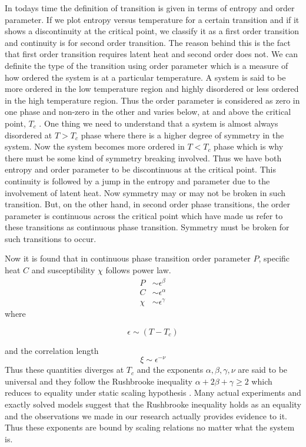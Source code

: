 	
	In todays time the definition of transition is given in terms of entropy and order parameter. If we plot entropy versus temperature for a certain transition and if it shows a discontinuity at the critical point, we classify it as a first order transition and continuity is for second order transition. The reason behind this is the fact that first order transition requires latent heat \cite{Perrot1998} and second order does not. We can definite the type of the transition using order parameter which is a measure of how ordered the system is at a particular temperature. A system is said to be more ordered in the low temperature region and highly disordered or less ordered in the high temperature region. Thus the order parameter is considered as zero in one phase and non-zero in the other and varies below, at and above the critical point, $T_c$ \cite{Rahman2017}. One thing we need to understand that a system is almost always disordered at $T > T_c$ phase where there is a higher degree of symmetry in the system. Now the system becomes more ordered in $T < T_c$ phase which is why there must be some kind of symmetry breaking involved. 
	Thus we have both entropy and order parameter to be discontinuous at the critical point. This continuity is followed by a jump in the entropy and parameter due to the involvement of latent heat. Now symmetry may or may not be broken in such transition. But, on the other hand, in second order phase transitions, the order parameter is continuous across the critical point which have made us refer to these transitions as continuous phase transition. Symmetry must be broken for such transitions to occur.
	
	Now it is found that in continuous phase transition order parameter $P$, specific heat $C$ and susceptibility $\chi$ follows power law.
	\begin{eqnarray}
		P &\sim \epsilon^\beta \\
		C &\sim \epsilon^\alpha \\
		\chi &\sim \epsilon^\gamma
	\end{eqnarray}
	where
	
	\begin{equation}
		\epsilon \sim (T-T_c)
	\end{equation} 
	
	 and the correlation length
	 \begin{equation}
		 \xi \sim \epsilon^{-\nu}
	 \end{equation}
	 Thus these quantities diverges at $T_c$ and the exponents $\alpha, \beta, \gamma, \nu$ are said to be universal and they follow the Rushbrooke inequality $\alpha + 2 \beta + \gamma \geq 2$ which reduces to equality under static scaling hypothesis \cite{Stanley1999}. Many actual experiments and exactly
	 solved models suggest that the Rushbrooke inequality holds as an equality \cite{Essam1978} and
	 the observations we made in our research actually provides evidence to it. Thus these exponents are bound by scaling relations no matter what the system is.
	 
